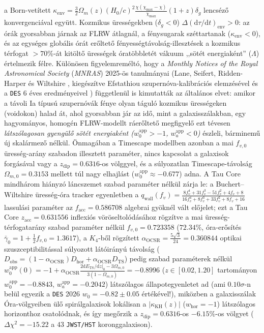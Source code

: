 \documentclass[11pt,a4paper]{article}
\begin{document}
\begin{enumerate}
  a Born-vetített $\kappa_{\mathrm{env}} = \frac{3}{2}\Omega_m(z)(H_0/c)^2 \frac{\chi(\chi_{\max}-\chi)}{\chi_{\max}}(1+z)\delta_g$ lencséző konvergenciával együtt. Kozmikus ürességekben ($\delta_g < 0$) $\Delta(\mathrm{d}\tau/\mathrm{d}t)_{\mathrm{env}} > 0$: az órák gyorsabban járnak az FLRW átlagnál, a fénysugarak széttartanak ($\kappa_{\mathrm{env}} < 0$), és az egységes globális órát erőltető fényességtávolság-illesztések a kozmikus térfogat $>70\%$-át kitöltő ürességek óratöbbletét vákuum ,,sötét energiaként'' ($\Lambda$) értelmezik félre. Különösen figyelemreméltó, hogy a \textit{Monthly Notices of the Royal Astronomical Society} (\textit{MNRAS}) 2025-ös tanulmányai (Lane, Seifert, Ridden-Harper és Wiltshire \cite{LaneWiltshire2025MNRAS,SeifertWiltshire2025MNRAS}, kiegészítve Efstathiou \cite{Efstathiou2025SN} szupernóva-kalibrációs elemzésével és a \texttt{DES} 6 éves eredményeivel \cite{DES2026DynDE}) függetlenül is kimutatták az általános elvet: amikor a távoli Ia típusú szupernóvák fénye olyan táguló kozmikus ürességeken (voidokon) halad át, ahol gyorsabban jár az idő, mint a galaxisszálakban, egy hagyományos, homogén FLRW-modellt ráerőltető megfigyelő ezt tévesen \emph{látszólagosan gyengülő sötét energiaként ($w_0^{\mathrm{app}} > -1$, $w_a^{\mathrm{app}} < 0$)} észleli, bárminemű új skalármező nélkül. Önmagában a Timescape modellben \cite{LaneWiltshire2025MNRAS,SeifertWiltshire2025MNRAS} azonban a mai $f_{v,0}$ üresség-arány szabadon illesztett paraméter, nincs kapcsolat a galaxisok forgásával vagy a $z_{\mathrm{dip}} = 0.6316$-os völggyel, és a súlyozatlan Timescape-távolság $\Omega_{m,0} = 0.3153$ mellett túl nagy elhajlást ($w_0^{\mathrm{app}} \approx -0.677$) adna. A Tau Core mindhárom hiányzó láncszemet szabad paraméter nélkül zárja le: a Buchert--Wiltshire üresség-óra tracker egyenletben a $q_{\mathrm{wall}}(f_v) = \frac{8f_v^4+31f_v^3-51f_v^2+4f_v+8}{16f_v^4+8f_v^3+33f_v^2+8f_v+16}$ lassulási paraméter az $f_{\mathrm{acc}} = 0.586708$ algebrai gyöknél vált előjelet; ezt a Tau Core $z_{\mathrm{acc}} = 0.631556$ inflexiós vöröseltolódásához rögzítve a mai üresség-térfogatarány szabad paraméter nélkül $f_{v,0} = \mathbf{0.723358}$ ($72.34\%$, óra-erősítés $\bar{\gamma}_0 = 1 + \frac{1}{2}f_{v,0} = 1.3617$), a $K_4$-ből rögzített $\alpha_{\mathrm{OCSR}} = \frac{5\sqrt{3}}{24} = 0.360844$ optikai szuszceptibilitással súlyozott látóirányú távolság ($D_{\mathrm{obs}} = (1-\alpha_{\mathrm{OCSR}})D_{\mathrm{hor}} + \alpha_{\mathrm{OCSR}}D_{\mathrm{TS}}$) pedig szabad paraméterek nélkül $w_0^{\mathrm{app}}(0) = -1 + \alpha_{\mathrm{OCSR}}\frac{2\mathrm{d}E_{\mathrm{TS}}/\mathrm{d}z|_0 - 3\Omega_{m,0}}{3(1-\Omega_{m,0})} = \mathbf{-0.8996}$ ($z \in [0.02,1.20]$ tartományon $w_0^{\mathrm{app}} = \mathbf{-0.8843}$, $w_a^{\mathrm{app}} = -0.2042$) látszólagos állapotegyenletet ad (ami $0.10\sigma$-n belül egyezik a \texttt{DES} 2026 $w_0 = -0.82 \pm 0.05$ értékével!), miközben a galaxisszálak Óra-völgyeiben ülő spirálgalaxisok lokálisan a $|\kappa_{\mathrm{KH}}(z)|$ ($w_{\mathrm{hor}} = -1$) látszólagos horizonthoz csatolódnak, és így megőrzik a $z_{\mathrm{dip}} = 0.6316$-os $-6.15\%$-os völgyet ($\Delta\chi^2 = -15.22$ a $43$ \texttt{JWST/HST} koronggalaxison).
\end{enumerate}
\end{document}
